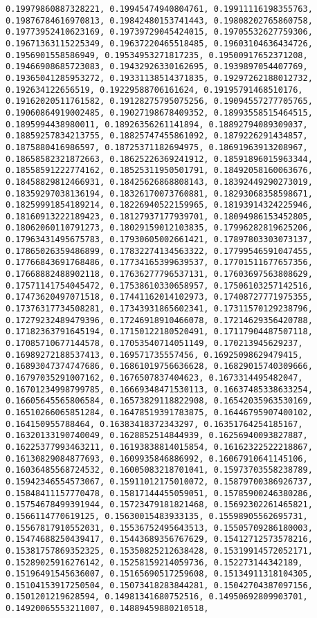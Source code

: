 \documentclass[11pt]{article}
\begin{document}
\begin{Verbatim}[commandchars=\\\{\}]
0.19979860887328221, 0.19945474940804761, 0.19911116198355763, 0.19876784616970813, 0.19842480153741443, 0.19808202765860758, 0.19773952410623169, 0.19739729045424015, 0.19705532627759306, 0.19671363115225349, 0.19637220465518485, 0.19603104636434726, 0.1956901558586949, 0.19534953271817235, 0.19500917652371208, 0.19466908685723083, 0.19432926330162695, 0.1939897054407769, 0.19365041285953272, 0.19331138514371835, 0.19297262188012732, 0.192634122656519, 0.19229588706161624, 0.19195791468510176, 0.19162020511761582, 0.19128275795075256, 0.19094557277705765, 0.19060864919002485, 0.19027198678409352, 0.18993558515464515, 0.1895994438980011, 0.18926356261141894, 0.18892794089309037, 0.18859257834213755, 0.18825747455861092, 0.1879226291434857, 0.1875880416986597, 0.18725371182694975, 0.18691963913208967, 0.18658582321872663, 0.18625226369241912, 0.18591896015963344, 0.18558591222774162, 0.18525311950501791, 0.18492058160063676, 0.18458829812466931, 0.18425626868808143, 0.18392449290273019, 0.18359297038136194, 0.18326170073760881, 0.18293068358598671, 0.18259991854189214, 0.18226940522159965, 0.18193914324225946, 0.18160913222189423, 0.18127937177939701, 0.18094986153452805, 0.18062060110791273, 0.18029159012103835, 0.17996282819625206, 0.17963431495675783, 0.17930605002661421, 0.17897803303073137, 0.17865026359486899, 0.17832274134563322, 0.17799546591047455, 0.17766843691768486, 0.17734165399639537, 0.17701511677657356, 0.17668882488902118, 0.17636277796537131, 0.17603697563808629, 0.17571141754045472, 0.17538610330658957, 0.17506103257142516, 0.17473620497071518, 0.17441162014102973, 0.17408727771975355, 0.17376317734508281, 0.17343931865602341, 0.17311570129238796, 0.17279232489479396, 0.17246918910466078, 0.17214629356420788, 0.17182363791645194, 0.17150122180520491, 0.17117904487507118, 0.17085710677144578, 0.17053540714051149, 0.170213945629237, 0.16989272188537413, 0.169571735557456, 0.16925098629479415, 0.16893047374747686, 0.16861019756636628, 0.16829015740309666, 0.16797035291007162, 0.1676507837404623, 0.1673314495482047, 0.16701234998799785, 0.16669348471530113, 0.16637485338633254, 0.16605645565806584, 0.16573829118822908, 0.16542035963530169, 0.16510266065851284, 0.16478519391783875, 0.16446795907400102, 0.164150955788464, 0.16383418372343297, 0.16351764254185167, 0.16320133190740049, 0.1628852514844939, 0.16256940093827887, 0.16225377993463211, 0.16193838814015854, 0.16162322522218867, 0.16130829084877693, 0.1609935846886992, 0.16067910641145106, 0.16036485568724532, 0.16005083218701041, 0.15973703558238789, 0.15942346554573067, 0.15911012175010072, 0.15879700386926737, 0.15848411157770478, 0.15817144455059051, 0.15785900246380286, 0.15754678499391944, 0.15723479181821468, 0.15692302261465821, 0.1566114770619125, 0.15630015483933135, 0.15598905562695731, 0.15567817910552031, 0.15536752495643513, 0.15505709286180003, 0.15474688250439417, 0.15443689356767629, 0.15412712573578216, 0.15381757869352325, 0.15350825212638428, 0.15319914572052171, 0.15289025916276142, 0.15258159214059736, 0.152273144342189, 0.15196491545636007, 0.15165690517259608, 0.15134911318104305, 0.15104153917250504, 0.15073418283844281, 0.15042704387097156, 0.1501201219628594, 0.14981341680752516, 0.14950692809903701, 0.14920065553211007, 0.14889459880210518, 
\end{Verbatim}
\end{document}
